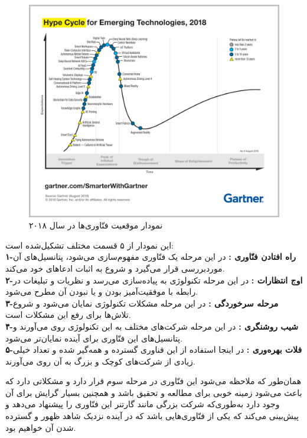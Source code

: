 \begin{figure}[tb]
	\centering
	\includegraphics[width=1\linewidth]{image/gartner}
	\caption {نمودار موقعیت فنّاوری‌ها در سال ۲۰۱۸\cite{gartner}}
	\label{fig:gartner}
\end{figure}
\noindent
این نمودار از ۵ قسمت مختلف تشکیل‌شده است: 
\\
\textbf{
	۱-راه افتادن فنّاوری  : }در این مرحله یک فنّاوری مفهوم‌سازی می‌شود، پتانسیل‌های آن موردبررسی قرار می‌گیرد و شروع به اثبات ادعاهای خود می‌کند.
\\
\textbf{
	۲-اوج انتظارات  : }در این مرحله تکنولوژی به پیاده‌سازی می‌رسد و نظریات و تبلیغات در رابطه با موفقیت‌آمیز بودن و یا نبودن آن مطرح می‌شود.
\\
\textbf{
	۳-مرحله سرخوردگی  :} در این مرحله مشکلات تکنولوژی نمایان می‌شود و شروع تلاش‌ها برای رفع این مشکلات است.
\\
\textbf{
	۴-شیب روشنگری  :} در این مرحله شرکت‌های مختلف به این تکنولوژی روی می‌آورند و پتانسیل‌های این فنّاوری برای آینده نمایان‌تر می‌شود.
\\
\textbf{
	۵-فلات بهره‌وری  :} در اینجا استفاده از این فناوری گسترده و همه‌گیر شده و تعداد خیلی زیادی از شرکت‌های کوچک و بزرگ به آن روی می‌آورند.

همان‌طور که ملاحظه می‌شود این فنّاوری در مرحله سوم قرار دارد و مشکلاتی دارد که باعث می‌شود زمینه خوبی برای مطالعه و تحقیق باشد و همچنین بسیار گرایش برای آن وجود دارد به‌طوری‌که شرکت بزرگی مانند گارتنر این فنّاوری را پیشنهاد می‌دهد و پیش‌بینی می‌کند که یکی از فنّاوری‌هایی باشد که در آینده نزدیک شاهد ظهور و گسترده شدن آن خواهیم بود.

